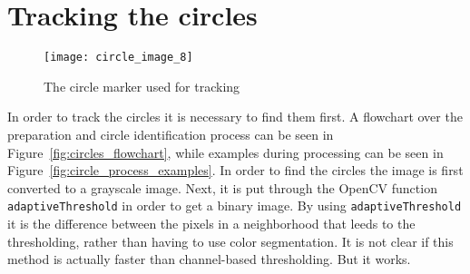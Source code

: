 \section{Tracking the circles}
\begin{figure}
\centering
\texttt{[image: circle\_image\_8]}
\caption{The circle marker used for tracking}
\label{fig:original_circle_marker}
\end{figure}

In order to track the circles it is necessary to find them first.
A flowchart over the preparation and circle identification process can be seen in Figure~\vref{fig:circles_flowchart},
while examples during processing can be seen in Figure~\vref{fig:circle_process_examples}.
In order to find the circles the image is first converted to a grayscale image.
Next, it is put through the OpenCV function \verb|adaptiveThreshold| in order to get a binary image.
By using \verb|adaptiveThreshold| it is the difference between the pixels in a neighborhood that leeds to the thresholding,
rather than having to use color segmentation.
It is not clear if this method is actually faster than channel-based thresholding.
But it works.



